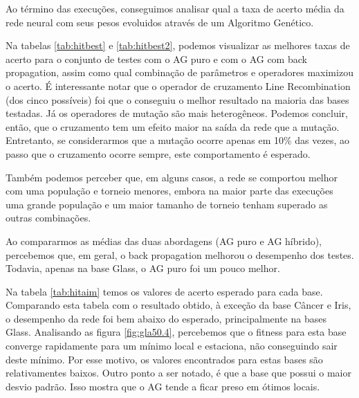\documentclass[12pt]{article}
\begin{document}
Ao término das execuções, conseguimos analisar qual a taxa de acerto média da rede neural com seus pesos evoluidos através de um Algoritmo Genético.

Na tabelas \ref{tab:hitbest} e \ref{tab:hitbest2}, podemos visualizar as melhores taxas de acerto para o conjunto de testes com o AG puro e com o AG com back propagation, assim como qual combinação de parâmetros e operadores maximizou o acerto.  É interessante notar que o operador de cruzamento Line Recombination (dos cinco possíveis) foi que o conseguiu o melhor resultado na maioria das bases testadas. Já os operadores de mutação são mais heterogêneos. Podemos concluir, então, que o cruzamento tem um efeito maior na saída da rede que a mutação. Entretanto, se considerarmos que a mutação ocorre apenas em 10\% das vezes, ao passo que o cruzamento ocorre sempre, este comportamento é esperado.

Também podemos perceber que, em alguns casos, a rede se comportou melhor com uma população e torneio menores, embora na maior parte das execuções uma grande população e um maior tamanho de torneio tenham superado as outras combinações.

Ao compararmos as médias das duas abordagens (AG puro e AG híbrido), percebemos que, em geral, o back propagation melhorou o desempenho dos testes. Todavia, apenas na base Glass, o AG puro foi um pouco melhor. 

Na tabela \ref{tab:hitaim} temos os valores de acerto esperado para cada base. Comparando esta tabela com o resultado obtido, à exceção da base Câncer e Iris, o desempenho da rede foi bem abaixo do esperado, principalmente na bases Glass. Analisando as figura \ref{fig:gla50.4}, percebemos que o fitness para esta base converge rapidamente para um mínimo local e estaciona, não conseguindo sair deste mínimo. Por esse motivo, os valores encontrados para estas bases são relativamentes baixos. Outro ponto a ser notado, é que a base que possui o maior desvio padrão. Isso mostra que o AG tende a ficar preso em ótimos locais.
\end{document}
